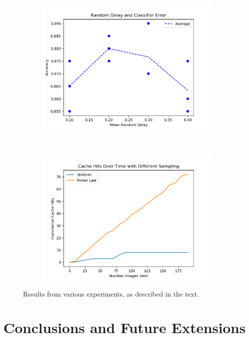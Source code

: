 \documentclass[11pt]{article}
\begin{document}
\begin{figure}[h]
\begin{subfigure}{0.35\textwidth}
    \end{subfigure}
    \\
    \begin{subfigure}{0.35\textwidth}
        \includegraphics[width=\textwidth]{plot_2_final.png}
    \end{subfigure}
    ~
    \begin{subfigure}{0.35\textwidth}
        \includegraphics[width=\textwidth]{cache_over_time.png}
    \end{subfigure}
    \caption{Results from various experiments, as described in the text.}
    \label{fig:results}
\end{figure}


\section{Conclusions and Future Extensions}
\end{document}
